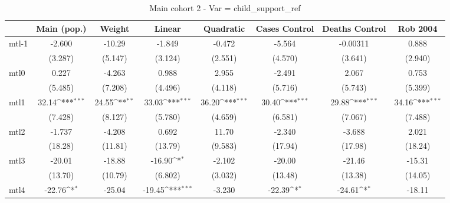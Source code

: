 \documentclass{article}
\begin{document}
{
\def\sym#1{\ifmmode^{#1}\else\(^{#1}\)\fi}
\begin{longtable}{l*{7}{c}}
\caption{Main cohort 2 - Var = child\_support\_ref}\\
\hline\hline\endfirsthead\hline\endhead\hline\endfoot\endlastfoot
                &\multicolumn{1}{c}{Main (pop.)}&\multicolumn{1}{c}{Weight}&\multicolumn{1}{c}{Linear}&\multicolumn{1}{c}{Quadratic}&\multicolumn{1}{c}{Cases Control}&\multicolumn{1}{c}{Deaths Control}&\multicolumn{1}{c}{Rob 2004}\\
\hline
mtl-1           &   -2.600         &   -10.29         &   -1.849         &   -0.472         &   -5.564         & -0.00311         &    0.888         \\
                &  (3.287)         &  (5.147)         &  (3.124)         &  (2.551)         &  (4.570)         &  (3.641)         &  (2.940)         \\
mtl0            &    0.227         &   -4.263         &    0.988         &    2.955         &   -2.491         &    2.067         &    0.753         \\
                &  (5.485)         &  (7.208)         &  (4.496)         &  (4.118)         &  (5.716)         &  (5.743)         &  (5.399)         \\
mtl1            &    32.14\sym{***}&    24.55\sym{**} &    33.03\sym{***}&    36.20\sym{***}&    30.40\sym{***}&    29.88\sym{***}&    34.16\sym{***}\\
                &  (7.428)         &  (8.127)         &  (5.780)         &  (4.659)         &  (6.581)         &  (7.067)         &  (7.488)         \\
mtl2            &   -1.737         &   -4.208         &    0.692         &    11.70         &   -2.340         &   -3.688         &    2.021         \\
                &  (18.28)         &  (11.81)         &  (13.79)         &  (9.583)         &  (17.94)         &  (17.98)         &  (18.24)         \\
mtl3            &   -20.01         &   -18.88         &   -16.90\sym{*}  &   -2.102         &   -20.00         &   -21.46         &   -15.31         \\
                &  (13.70)         &  (10.79)         &  (6.802)         &  (3.032)         &  (13.48)         &  (13.38)         &  (14.05)         \\
mtl4            &   -22.76\sym{*}  &   -25.04         &   -19.45\sym{***}&   -3.230         &   -22.39\sym{*}  &   -24.61\sym{*}  &   -18.11         \\

\end{longtable}}
\end{document}
